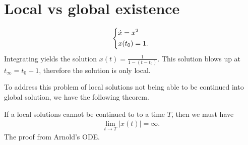 \section{Local vs global existence}
\begin{ex}
	\begin{align}
		\begin{dcases}
			\dot{x} = x^2 \\
			x(t_0) = 1.
		\end{dcases}
	\end{align}
	Integrating yields the solution $x(t) = \frac{1}{1 - (t-t_0)}$. This solution blows up at $t_{\infty }=t_0 + 1$, therefore the solution is only local.	
\begin{figure}[h]
\centering	
{}
\end{figure}
\end{ex}
To address this problem of local solutions not being able to be continued into global solution, we have the following theorem.
\begin{theorem}
	If a local solutions cannot be continued to to a time $T$, then we must have
	\begin{align}
		\boxed{\lim_{t\to T} |x(t)|= \infty.}
	\end{align}
The proof from Arnold's ODE.	
\end{theorem}

